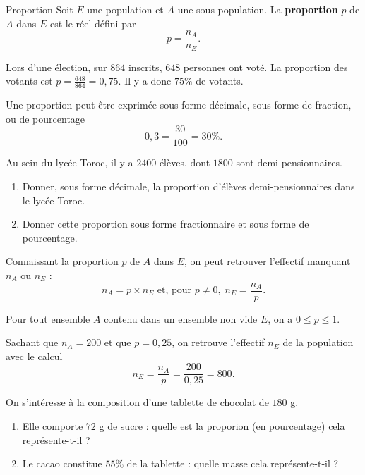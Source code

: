 \documentclass[11pt]{article}
\begin{document}
\begin{defi}{Proportion}
  Soit $E$ une population et $A$ une sous-population. La \textbf{proportion} $p$
  de $A$ dans $E$ est le réel défini par
      \[
        p = \frac{n_A}{n_E}.
      \]
\end{defi}
\begin{exemple}
  Lors d'une élection, sur $864$ inscrits, $648$ personnes ont voté. La
  proportion des votants est $p=\frac{648}{864}=0,75.$ Il y a donc $75\%$ de
  votants.
\end{exemple}
\begin{rmq}
  Une proportion peut être exprimée sous forme décimale, sous forme de fraction,
  ou de pourcentage
  \[
    0,3 = \frac{30}{100} = 30\%.
  \]
\end{rmq}
\begin{app}
  Au sein du lycée Toroc, il y a $2400$ élèves, dont $1800$ sont
  demi-pensionnaires.
  \begin{enumerate}
    \item Donner, sous forme décimale, la proportion d'élèves demi-pensionnaires
      dans le lycée Toroc.
    \item Donner cette proportion sous forme fractionnaire et sous forme de
      pourcentage.
  \end{enumerate}
\end{app}

\begin{prop}
  Connaissant la proportion $p$ de $A$ dans $E$, on peut retrouver l'effectif
  manquant $n_A$ ou $n_E$ :
  \[
    n_A = p\times n_E\text{ et, pour }p\neq0,\;n_E=\frac{n_A}{p}.
  \]
\end{prop}
\begin{prop}
  Pour tout ensemble $A$ contenu dans un ensemble non vide $E$, on a $0\leq
  p\leq1$.
\end{prop}
\begin{exemple}
  Sachant que $n_A=200$ et que $p=0,25$, on retrouve l'effectif $n_E$ de la
  population avec le calcul
  \[
    n_E = \frac{n_A}{p} = \frac{200}{0,25}=800.
  \]
\end{exemple}
\begin{app}
  On s'intéresse à la composition d'une tablette de chocolat de $180$ g.
  \begin{enumerate}
    \item Elle comporte $72$ g de sucre : quelle est la proporion (en
      pourcentage) cela représente-t-il ?
    \item Le cacao constitue $55\%$ de la tablette : quelle masse cela
      représente-t-il ?
  \end{enumerate}
\end{app}
\end{document}
